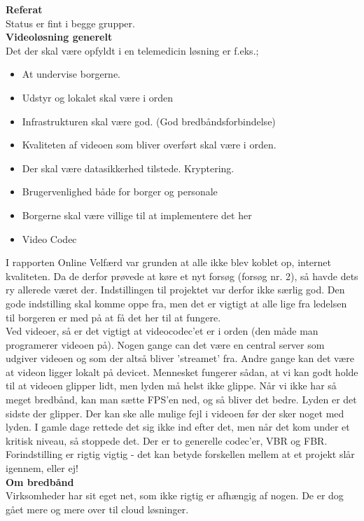 \textbf{Referat} 
\\
Status er fint i begge grupper.\\
\textbf{Videoløsning generelt}\\
Det der skal være opfyldt i en telemedicin løsning er f.eks.; 
\begin{itemize}
	\item At undervise borgerne.
	\item Udstyr og lokalet skal være i orden
	\item Infrastrukturen skal være god. (God bredbåndsforbindelse)
	\item Kvaliteten af videoen som bliver overført skal være i orden.
	\item Der skal være datasikkerhed tilstede. Kryptering.
	\item Brugervenlighed både for borger og personale
	\item Borgerne skal være villige til at implementere det her
	\item Video Codec
\end{itemize}
I rapporten Online Velfærd var grunden at alle ikke blev koblet op, internet kvaliteten. Da de derfor prøvede at køre et nyt forsøg (forsøg nr. 2), så havde dets ry allerede været der. Indstillingen til projektet var derfor ikke særlig god. Den gode indstilling skal komme oppe fra, men det er vigtigt at alle lige fra ledelsen til borgeren er med på at få det her til at fungere.\\
Ved videoer, så er det vigtigt at videocodec'et er i orden (den måde man programerer videoen på). Nogen gange can det være en central server som udgiver videoen og som der altså bliver 'streamet' fra. Andre gange kan det være at videon ligger lokalt på devicet. Mennesket fungerer sådan, at vi kan godt holde til at videoen glipper lidt, men lyden må helst ikke glippe. Når vi ikke har så meget bredbånd, kan man sætte FPS'en ned, og så bliver det bedre. Lyden er det sidste der glipper. Der kan ske alle mulige fejl i videoen før der sker noget med lyden. I gamle dage rettede det sig ikke ind efter det, men når det kom under et kritisk niveau, så stoppede det. Der er to generelle codec'er, VBR og FBR. \\
Forindstilling er rigtig vigtig - det kan betyde forskellen mellem at et projekt slår igennem, eller ej! \\
\textbf{Om bredbånd}\\
Virksomheder har sit eget net, som ikke rigtig er afhængig af nogen. De er dog gået mere og mere over til cloud løsninger. 
